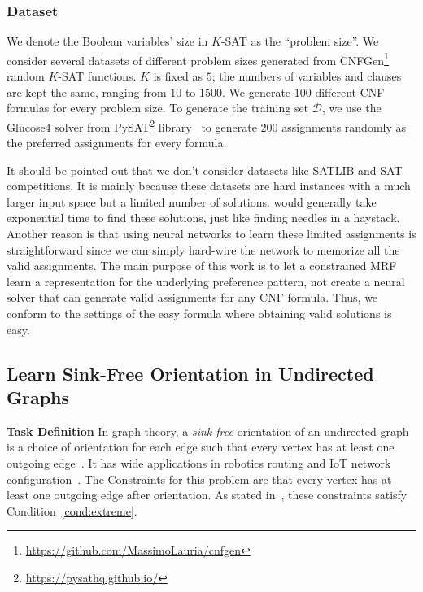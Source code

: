%

\subsubsection*{Dataset} We denote the Boolean variables' size in $K$-SAT as the ``problem size''. We
consider several datasets of different problem sizes generated from
CNFGen\footnote{\url{https://github.com/MassimoLauria/cnfgen}}~\citep{DBLP:conf/sat/LauriaENV17}
random $K$-SAT functions. $K$ is fixed as $5$; the numbers of variables and
clauses are kept the same, ranging from $10$ to $1500$. We generate $100$
different CNF formulas for every problem size. To generate the training set
$\mathcal{D}$, we use the Glucose4 solver from
PySAT\footnote{\url{https://pysathq.github.io/}}
library~\citep{DBLP:conf/sat/IgnatievMM18} to generate $200$ assignments
randomly as the preferred assignments for every formula.

It should be pointed out that we don't consider datasets like SATLIB and SAT
competitions. It is mainly because these datasets are hard instances with a
much larger input space but a limited number of solutions. \nls would generally
take exponential time to find these solutions, just like finding needles in a
haystack. Another reason is that using neural networks to learn these
limited assignments is straightforward since we can simply hard-wire the
network to memorize all the valid assignments. The main purpose of this work is
to let a constrained MRF learn a representation for the underlying preference
pattern, not create a neural solver that can generate valid assignments for any
CNF formula. Thus, we conform to the settings of the easy formula where
obtaining valid solutions is easy.

\subsection{Learn Sink-Free Orientation in Undirected Graphs}
\textbf{Task Definition} In graph theory, a \textit{sink-free} orientation of an undirected graph is a choice of orientation for each edge such that every vertex has at least one outgoing edge~\citep{DBLP:journals/combinatorics/CohnPP02}. It has wide applications in robotics routing and IoT network configuration~\citep{takahashi2009communication}.  The Constraints for this problem are that every vertex has at least one outgoing edge after orientation. As stated in~\citep{DBLP:journals/jacm/GuoJL19}, these constraints satisfy Condition~\ref{cond:extreme}.

